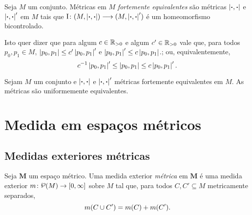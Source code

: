 \begin{definition}
Seja $M$ um conjunto. Métricas em $M$ \emph{fortemente equivalentes} são métricas $\left\vert{\bm{\cdot}},{\bm{\cdot}}\right\vert$ e $\left\vert{\bm{\cdot}},{\bm{\cdot}}\right\vert'$ em $M$ tais que $\mathrm{I}\colon \allowbreak (M,\left\vert{\bm{\cdot}},{\bm{\cdot}}\right\vert) \longrightarrow (M,\left\vert{\bm{\cdot}},{\bm{\cdot}}\right\vert')$ é um homeomorfismo bicontrolado.
\end{definition}

Isto quer dizer que para algum $c \in \mathbb{R}_{>0}$ e algum $c' \in \mathbb{R}_{>0}$ vale que, para todos $p_0,p_1 \in M$, $\left\vert{p_0},{p_1}\right\vert \leq c'\left\vert{p_0},{p_1}\right\vert'$ e $\left\vert{p_0},{p_1}\right\vert' \leq c\left\vert{p_0},{p_1}\right\vert$.; ou, equivalentemente,
	\[
	c^{-1}\left\vert{p_0},{p_1}\right\vert' \leq \left\vert{p_0},{p_1}\right\vert \leq c\left\vert{p_0},{p_1}\right\vert'.
	\]

\begin{proposition}
Sejam $M$ um conjunto e $\left\vert{\bm{\cdot}},{\bm{\cdot}}\right\vert$ e $\left\vert{\bm{\cdot}},{\bm{\cdot}}\right\vert'$ métricas fortemente equivalentes em $M$. As métricas são uniformemente equivalentes.
\end{proposition}

\section{Medida em espaços métricos}

\subsection{Medidas exteriores métricas}

\begin{definition}
Seja $\bm M$ um espaço métrico. Uma medida exterior \emph{métrica} em $\bm M$ é uma medida exterior $\med\colon \p(M) \to \intff{0}{\infty}$ sobre $M$ tal que, para todos $C,C' \subseteq M$ metricamente separados,
	\begin{equation*}
	m(C \cup C') = m(C) + m(C').
	\end{equation*}
\end{definition}

